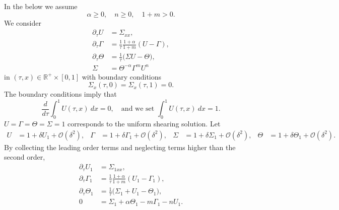 \documentclass[a4paper,11pt]{article}
\theoremstyle{remark}
\begin{document}
\pagebreak
In the below we assume
$$ \alpha\ge0, \quad n\ge0, \quad 1+m>0.$$
We consider
\begin{equation} \label{eq:system}
 \begin{aligned}
  \partial_\tau U &= \Sigma_{xx},\\
  \partial_\tau\Gamma &= \frac{1}{\tau}\frac{1+\alpha}{1+m}(U-\Gamma),\\
  \partial_\tau\Theta &= \frac{1}{\tau}\Big(\Sigma U -\Theta\Big),\\
  \Sigma &= \Theta^{-\alpha}\Gamma^m U^n
 \end{aligned}
\end{equation}
in $(\tau,x)\in \mathbb{R}^+\times [0,1]$ with boundary conditions
\begin{equation}
 \Sigma_x(\tau,0)=\Sigma_x(\tau,1)=0.
\end{equation}
The boundary conditions imply that
\begin{equation}
 \frac{d}{d\tau}\int_0^1 U(\tau,x) \: dx = 0, \quad \text{and we set } \int_0^1 U(\tau,x) \: dx = 1.
\end{equation}
$ U=\Gamma=\Theta=\Sigma=1 $ corresponds to the uniform shearing solution.
Let
\begin{align*}
 U &= 1 + \delta U_1 + \mathcal{O}(\delta^2), & \Gamma &= 1 + \delta \Gamma_1 + \mathcal{O}(\delta^2), &
 \Sigma &= 1 + \delta \Sigma_1 + \mathcal{O}(\delta^2), & \Theta &= 1 + \delta \Theta_1 + \mathcal{O}(\delta^2).
\end{align*}
By collecting the leading order terms and neglecting terms higher than the  second order,
\begin{equation} \label{eq:linsystem}
 \begin{aligned}
  \partial_\tau U_1 &= \Sigma_{1xx},\\
  \partial_\tau\Gamma_1 &= \frac{1}{\tau}\frac{1+\alpha}{1+m}(U_1-\Gamma_1),\\
  \partial_\tau\Theta_1 &= \frac{1}{\tau}\Big(\Sigma_1+ U_1 -\Theta_1\Big),\\
  0&=\Sigma_1 + \alpha\Theta_1 -m\Gamma_1 - nU_1 .
 \end{aligned}
\end{equation}
\end{document}
